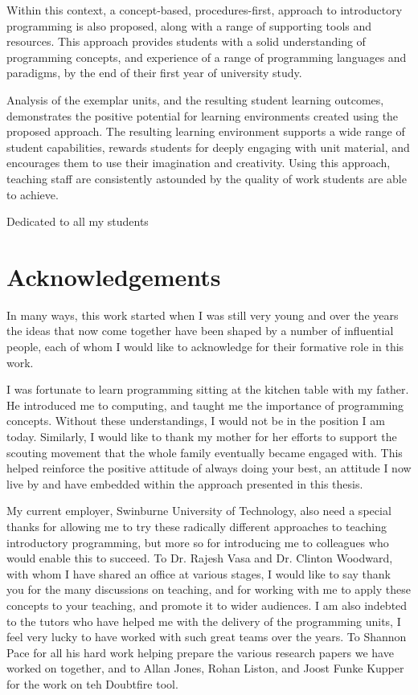 Within this context, a concept-based, procedures-first, approach to introductory programming is also proposed, along with a range of supporting tools and resources. This approach provides students with a solid understanding of programming concepts, and experience of a range of programming languages and paradigms, by the end of their first year of university study. 

Analysis of the exemplar units, and the resulting student learning outcomes, demonstrates the positive potential for learning environments created using the proposed approach. The resulting learning environment supports a wide range of student capabilities, rewards students for deeply engaging with unit material, and encourages them to use their imagination and creativity. Using this approach, teaching staff are consistently astounded by the quality of work students are able to achieve.

\newpage \vspace*{8cm} 
\begin{center}
	\large Dedicated to all my students
\end{center}


\chapter*{Acknowledgements}
\vspace{-0.5cm}
In many ways, this work started when I was still very young and over the years the ideas that now come together have been shaped by a number of influential people, each of whom I would like to acknowledge for their formative role in this work.

I was fortunate to learn programming sitting at the kitchen table with my father. He introduced me to computing, and taught me the importance of programming concepts. Without these understandings, I would not be in the position I am today. Similarly, I would like to thank my mother for her efforts to support the scouting movement that the whole family eventually became engaged with. This helped reinforce the positive attitude of always doing your best, an attitude I now live by and have embedded within the approach presented in this thesis.

My current employer, Swinburne University of Technology, also need a special thanks for allowing me to try these radically different approaches to teaching introductory programming, but more so for introducing me to colleagues who would enable this to succeed. To Dr. Rajesh Vasa and Dr. Clinton Woodward, with whom I have shared an office at various stages, I would like to say thank you for the many discussions on teaching, and for working with me to apply these concepts to your teaching, and promote it to wider audiences. I am also indebted to the tutors who have helped me with the delivery of the programming units, I feel very lucky to have worked with such great teams over the years. To Shannon Pace for all his hard work helping prepare the various research papers we have worked on together, and to Allan Jones, Rohan Liston, and Joost Funke Kupper for the work on teh Doubtfire tool. 

